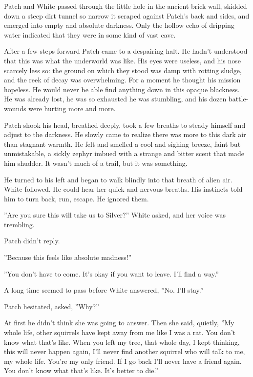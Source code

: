 \documentclass[12pt]{book}
\begin{document}
 Patch and White passed through the little hole in the ancient brick wall, skidded down a steep dirt tunnel so narrow it scraped against Patch's back and sides, and emerged into empty and absolute darkness. Only the hollow echo of dripping water indicated that they were in some kind of vast cave.\par
 After a few steps forward Patch came to a despairing halt. He hadn't understood that this was what the underworld was like. His eyes were useless, and his nose scarcely less so: the ground on which they stood was damp with rotting sludge, and the reek of decay was overwhelming. For a moment he thought his mission hopeless. He would never be able find anything down in this opaque blackness. He was already lost, he was so exhausted he was stumbling, and his dozen battle-wounds were hurting more and more. \par
 Patch shook his head, breathed deeply, took a few breaths to steady himself and adjust to the darkness. He slowly came to realize there was more to this dark air than stagnant warmth. He felt and smelled a cool and sighing breeze, faint but unmistakable, a sickly zephyr imbued with a strange and bitter scent that made him shudder. It wasn't much of a trail, but it was something.\par
He turned to his left and began to walk blindly into that breath of alien air. White followed. He could hear her quick and nervous breaths. His instincts told him to turn back, run, escape. He ignored them.\par
 ''Are you sure this will take us to Silver?'' White asked, and her voice was trembling.\par
 Patch didn't reply.\par
 ''Because this feels like absolute madness!''\par
 ''You don't have to come. It's okay if you want to leave. I'll find a way.''\par
 A long time seemed to pass before White answered, ''No. I'll stay.''\par
 Patch hesitated, asked, ''Why?''\par
 At first he didn't think she was going to answer. Then she said, quietly, ''My whole life, other squirrels have kept away from me like I was a rat. You don't know what that's like. When you left my tree, that whole day, I kept thinking, this will never happen again, I'll never find another squirrel who will talk to me, my whole life. You're my only friend. If I go back I'll never have a friend again. You don't know what that's like. It's better to die.''\par
\end{document}
